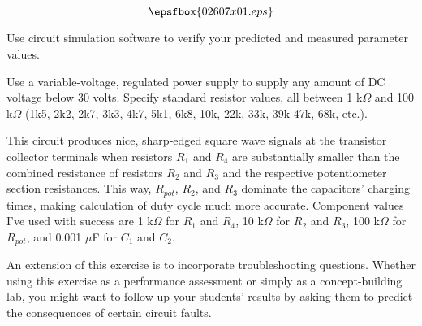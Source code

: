 

$$\epsfbox{02607x01.eps}$$

\vfil \eject






Use circuit simulation software to verify your predicted and measured parameter values.







Use a variable-voltage, regulated power supply to supply any amount of DC voltage below 30 volts.  Specify standard resistor values, all between 1 k$\Omega$ and 100 k$\Omega$ (1k5, 2k2, 2k7, 3k3, 4k7, 5k1, 6k8, 10k, 22k, 33k, 39k 47k, 68k, etc.). 

This circuit produces nice, sharp-edged square wave signals at the transistor collector terminals when resistors $R_1$ and $R_4$ are substantially smaller than the combined resistance of resistors $R_2$ and $R_3$ and the respective potentiometer section resistances.  This way, $R_{pot}$, $R_2$, and $R_3$ dominate the capacitors' charging times, making calculation of duty cycle much more accurate.  Component values I've used with success are 1 k$\Omega$ for $R_1$ and $R_4$, 10 k$\Omega$ for $R_2$ and $R_3$, 100 k$\Omega$ for $R_{pot}$, and 0.001 $\mu$F for $C_1$ and $C_2$.

An extension of this exercise is to incorporate troubleshooting questions.  Whether using this exercise as a performance assessment or simply as a concept-building lab, you might want to follow up your students' results by asking them to predict the consequences of certain circuit faults.




